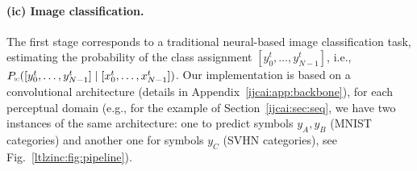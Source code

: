 	\paragraph{{\sc (ic)} Image classification.} The first stage corresponds to a traditional neural-based image classification task, estimating the probability of the class assignment $[y_{0}^{t}, \ldots, y_{N-1}^{t}]$, i.e., $P_{\text{\sc\tiny ic}}([y_{0}^{t}, \ldots, y_{N-1}^{t}] \mid [x_{0}^{t}, \ldots, x_{N-1}^{t}])$. %
	Our implementation is based on a convolutional architecture (details in Appendix~\ref{ijcai:app:backbone}), for each perceptual domain %
	(e.g., for the example of Section~\ref{ijcai:sec:seq}, we have two instances of the same architecture: one to predict symbols $y_A, y_B$ (MNIST categories) and another one for symbols $y_C$ (SVHN categories), see Fig.~\ref{ltlzinc:fig:pipeline}).
	
